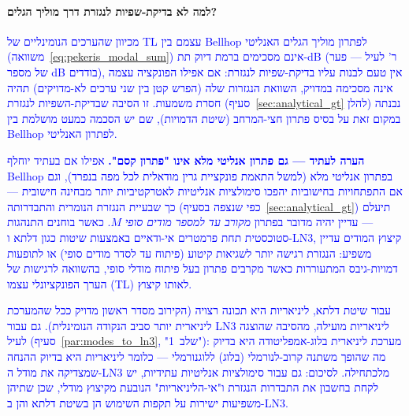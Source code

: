 \documentclass[12pt,a4paper]{article}
\DeclareRobustCommand{\aiedit}[1]{\textcolor{blue}{#1}}
\begin{document}
\paragraph{למה לא בדיקת-שפיות לנגזרת דרך מוליך הגלים?}
\aiedit{מכיוון שהערכים הנומינליים של TL עצמם בין \textenglish{Bellhop} לפתרון מוליך הגלים
האנליטי (משוואה~\ref{eq:pekeris_modal_sum}) אינם מסכימים ברמת דיוק תת-dB (ר' לעיל —
פער של מספר dB בודדים), אין טעם לבנות עליו בדיקת-שפיות לנגזרת: אם אפילו הפונקציה
עצמה אינה מסכימה במדויק, השוואת הנגזרות שלה (הפרש קטן בין שני ערכים לא-מדויקים)
תהיה חסרת משמעות. זו הסיבה שבדיקת-השפיות לנגזרת (סעיף~\ref{sec:analytical_gt} להלן)
נבנתה במקום זאת על בסיס פתרון חצי-המרחב (שיטת הדמויות), שם יש הסכמה כמעט מושלמת
בין \textenglish{Bellhop} לפתרון האנליטי.}

\aiedit{\textbf{הערה לעתיד --- גם פתרון אנליטי מלא אינו "פתרון קסם".} אפילו אם בעתיד יוחלף
\textenglish{Bellhop} בפתרון אנליטי מלא (למשל התאמת פונקציית גרין מודאלית לכל מפה
בנפרד), וגם אם התפתחויות בחישוביות יהפכו סימולציות אנליטיות לאטרקטיביות יותר
מבחינה חישובית --- כך שבעיית הנגזרת הנומרית והתבדרותה (כפי שנצפה בסעיף~\ref{sec:analytical_gt})
תיעלם --- עדיין יהיה מדובר בפתרון \emph{מקורב עד למספר מודים סופי} $M$. כאשר בוחנים
התנהגות סטוכסטית תחת פרמטרים אי-ודאיים באמצעות שיטות כגון דלתא ו-LN3, קיצוץ המודים
עדיין משפיע: הנגזרת רגישה יותר  לשגיאות קיטוע (פיתוח עד לסדר מודים סופי) או
לתופעות דמויות-גיבס המתעוררות כאשר מקרבים פתרון בעל פיתוח מודלי סופי, בהשוואה
לרגישות של הערך הפונקציונלי עצמו (TL) לאותו קיצוץ.}

\aiedit{עבור שיטת דלתא, ליניאריות היא תכונה רצויה  (הקירוב מסדר ראשון מדויק ככל
שהמערכת ליניארית יותר סביב הנקודה הנומינלית). גם עבור LN3 ליניאריות מועילה, מהסיבה
שהוצגה לעיל (סעיף~\ref{par:modes_to_ln3}, "שלב~1"): מערכת ליניארית בלוג-אמפליטודה
היא בדיוק מה שהופך משתנה קרוב-לנורמלי (בלוג) ללוגנורמלי --- כלומר ליניאריות היא
בדיוק ההנחה שמצדיקה את מודל ה-LN3 מלכתחילה. לסיכום: גם עבור סימולציות אנליטיות
עתידיות, יש לקחת בחשבון את התבדרות הנגזרת ו"אי-הליניאריות" הנובעת מקיצוץ מודלי,
שכן שתיהן משפיעות ישירות על תקפות השימוש הן בשיטת דלתא והן ב-LN3.}

\end{document}

